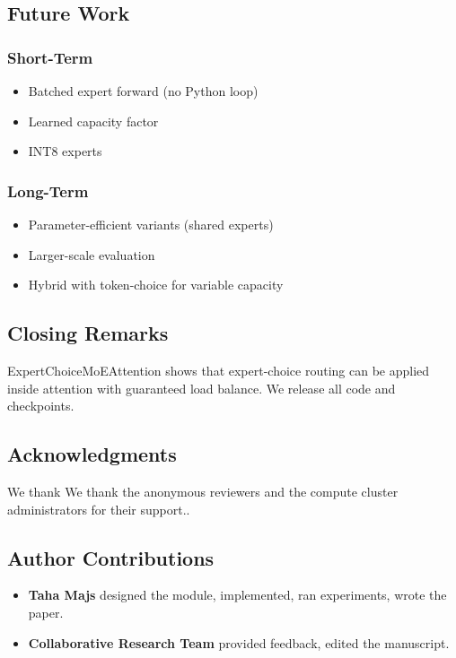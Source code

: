 \subsection{Future Work}

\subsubsection{Short-Term}
\begin{itemize}
\item Batched expert forward (no Python loop)
\item Learned capacity factor
\item INT8 experts

\end{itemize}
\subsubsection{Long-Term}
\begin{itemize}
\item Parameter-efficient variants (shared experts)
\item Larger-scale evaluation
\item Hybrid with token-choice for variable capacity

\end{itemize}
\subsection{Closing Remarks}

ExpertChoiceMoEAttention shows that expert-choice routing can be applied 
inside attention with guaranteed load balance. We release all code and 
checkpoints.

\subsection{Acknowledgments}

We thank We thank the anonymous reviewers and the compute cluster administrators for their support..

\subsection{Author Contributions}

\begin{itemize}
\item \textbf{Taha Majs} designed the module, implemented, ran experiments, wrote
  the paper.
\item \textbf{Collaborative Research Team} provided feedback, edited the manuscript.

\end{itemize}
